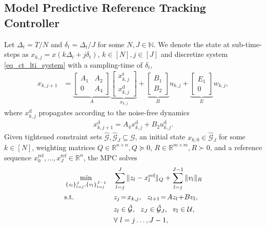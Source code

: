 \documentclass{IEEEtran}
\begin{document}
\subsection{Model Predictive Reference Tracking Controller}
Let $\Delta_t=T/N$ and $\delta_t=\Delta_t/J$ for some $N,J\in\mathbb{N}$. We denote the state at sub-time-steps as $x_{k,j}=x(k\Delta_t + j\delta_t)$, $k\in[N],j\in[J]$ and discretize system \eqref{eq_ct_lti_system} with a sampling-time of $\delta_t$,
\begin{align}
    x_{k,j+1} &=
    \underbrace{\begin{bmatrix}
        A_{1} & A_{2} \\ 0 & A_{4}
    \end{bmatrix}}_{A}\underbrace{\begin{bmatrix}
        x^{\text{s}}_{k,j} \\ x^{\text{d}}_{k,j}
    \end{bmatrix}}_{x_{k,j}}\!+\!\underbrace{\begin{bmatrix}
        B_{1} \\ B_{2}
    \end{bmatrix}}_{B}u_{k,j} + \underbrace{\begin{bmatrix}
        E_{1} \\ 0
    \end{bmatrix}}_{E}w_{k,j},
\label{eq_discrete_time_lti_system}
\end{align} 
where $x_{k,j}^{\text{d}}$ propagates according to the noise-free dynamics
\begin{align}
    \label{eq_discrete_time_lti_system_deterministic_subsystem}
    x^{\text{d}}_{k,j+1}=A_4x^{\text{d}}_{k,j}+B_2u^{\text{d}}_{k,j}.
\end{align}
Given tightened constraint sets $\hat{\mathcal{G}}, \hat{\mathcal{G}}_{J}\subseteq \mathcal{G}$, an initial state ${x}_{k,0}\in\hat{\mathcal{G}}_{J}$ for some $k\in[N]$, weighting matrices $Q\in\mathbb{R}^{n\times n}, Q\succeq 0$, $R\in\mathbb{R}^{m\times m}, R\succ 0$, and a reference sequence ${x}_{0}^{\text{ref}},\dots,{x}_{J}^{\text{ref}}\in\mathbb{R}^n$, the MPC solves
\begin{subequations}
    \makeatletter
    \def\@currentlabel{MPC}
    \makeatother
    \label{eq_smpc_inner_layer}
    \renewcommand{\theequation}{MPC.\arabic{equation}} 
\begin{align}
    &\min_{\{z_l\}_{l=j}^J,  \{v_l\}_{l=j}^{J-1}} && \sum_{l=j}^{J} \|z_l-x_{l}^{\text{ref}}\|_{Q} + \sum_{l=j}^{J-1}\|v_l\|_R \\
    &\text{s.t.} \  && z_{j}\!=\!x_{k,j}, \ \ z_{l+1}\!=\!Az_l\!+\!Bv_l, \label{eq_smpc_inner_layer_initial_state_constraint}\\
    &&& {z}_l\in\hat{\mathcal{G}}, \ \ {z}_{J} \in \hat{\mathcal{G}}_{J}, \ \ v_l\in\mathcal{U}, \label{SMPC_input_constraint}
    \\&&& \forall \ l=j\dots,J-1,
\end{align}
\end{subequations}
\end{document}
